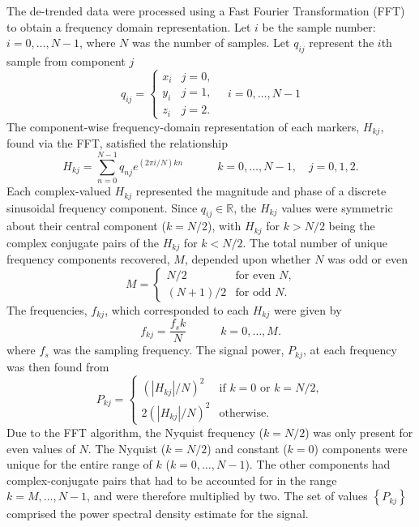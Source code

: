 \documentclass[
  a4paper,
  11pt,
  twoside,
  toc=flat,
  listof=flat
]{scrbook}
\begin{document}
The de-trended data were processed using a Fast Fourier Transformation (FFT) to obtain a frequency domain representation.  Let $i$ be the sample number: $i = 0, \ldots, N-1$, where $N$ was the number of samples.  Let $q_{ij}$ represent the $i$th sample from component $j$
\begin{equation}
q_{ij} = \begin{cases}
x_i & j=0, \\
y_i & j=1, \\
z_i & j=2.
\end{cases} \hspace{1em} i = 0, \ldots, N-1
\end{equation}
The component-wise frequency-domain representation of each markers, $H_{kj}$, found via the FFT, satisfied the relationship
\begin{equation}
H_{kj} = \sum_{n=0}^{N-1} q_{nj} e^{(2\pi i/N)kn} \hspace{3em} k = 0, \ldots, N-1, \hspace{1em} j = 0, 1, 2.
\label{eq:dft}
\end{equation}
Each complex-valued $H_{kj}$ represented the magnitude and phase of a discrete sinusoidal frequency component.  Since $q_{ij} \in \mathbb{R}$, the $H_{kj}$ values were symmetric about their central component ($k = N/2$), with $H_{kj}$ for $k > N/2$ being the complex conjugate pairs of the $H_{kj}$ for $k < N/2$.  The total number of unique frequency components recovered, $M$, depended upon whether $N$ was odd or even
\begin{equation}
M = 
\begin{cases}
N/2 & \text{for even $N$,} \\
(N + 1)/2 & \text{for odd $N$.}
\end{cases}
\end{equation}
The frequencies, $f_{kj}$, which corresponded to each $H_{kj}$ were given by
\begin{equation}
f_{kj} = \frac{f_s k}{N} \hspace{3em} k = 0, \ldots, M.
\end{equation}
where $f_s$ was the sampling frequency.  The signal power, $P_{kj}$, at each frequency was then found from
\begin{equation}
P_{kj} = \begin{cases}
\left(\left| H_{kj} \right| / N \right)^2 & \text{if $k=0$ or $k=N/2$},\\
2\left(\left| H_{kj} \right| / N \right)^2 & \text{otherwise.}
\end{cases}
\end{equation}
Due to the FFT algorithm, the Nyquist frequency ($k=N/2$) was only present for even values of $N$. The Nyquist ($k=N/2$) and constant ($k=0$) components were unique for the entire range of $k$ ($k=0,\ldots,N-1$).  The other components had complex-conjugate pairs that had to be accounted for in the range $k=M,\ldots,N-1$, and were therefore multiplied by two.  The set of values $\left\{ P_{kj} \right\}$ comprised the power spectral density estimate for the signal.
\end{document}
